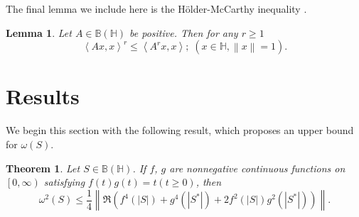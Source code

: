 \documentclass[12pt,twoside,reqno]{amsart}
\newtheorem{theorem}{Theorem}[section]
\newtheorem{lemma}{Lemma}[section]
\numberwithin{equation}{section}
\begin{document}
The final lemma we include here is the Hölder-McCarthy inequality \cite[Theorem 1.2]{Micic}.
\begin{lemma}\label{28}
Let $A\in \mathbb B\left( \mathbb H \right)$ be positive. Then for any $r\ge 1$
\[{{\left\langle Ax,x \right\rangle }^{r}}\le \left\langle {{A}^{r}}x,x \right\rangle ;\;\left( x\in \mathbb H,\left\| x \right\|=1 \right).\]
\end{lemma}










\section{Results}
We begin this section with the following result, which proposes an upper bound for $\omega \left( S \right)$.
\begin{theorem}
Let $S\in \mathbb B\left( \mathbb H \right)$. If $f$, $g$ are nonnegative continuous functions on $\left[ 0,\infty  \right)$ satisfying $f\left( t \right)g\left( t \right)=t\left( t\ge 0 \right)$, then
\[{{\omega }^{2}}\left( S \right)\le \frac{1}{4}\left\| \Re\left( {{f}^{4}}\left( \left| S \right| \right)+{{g}^{4}}\left( \left| {{S}^{*}} \right| \right)+2{{f}^{2}}\left( \left| S \right| \right){{g}^{2}}\left( \left| {{S}^{*}} \right| \right) \right) \right\|.\]
\end{theorem}
\end{document}

